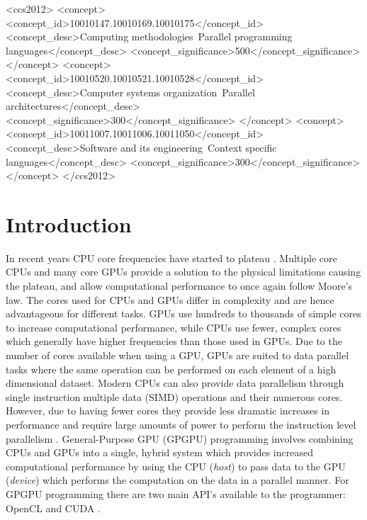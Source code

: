 \documentclass{sig-alternate-05-2015}
\begin{document}
%
%

\begin{CCSXML}
	<ccs2012>
	<concept>
	<concept_id>10010147.10010169.10010175</concept_id>
	<concept_desc>Computing methodologies~Parallel programming
	languages</concept_desc>
	<concept_significance>500</concept_significance>
	</concept>
	<concept>
	<concept_id>10010520.10010521.10010528</concept_id>
	<concept_desc>Computer systems organization~Parallel
	architectures</concept_desc>
	<concept_significance>300</concept_significance>
	</concept>
	<concept>
	<concept_id>10011007.10011006.10011050</concept_id>
	<concept_desc>Software and its engineering~Context specific
	languages</concept_desc>
	<concept_significance>300</concept_significance>
	</concept>
	</ccs2012>
\end{CCSXML}

%
%

%
%
\printccsdesc



\section{Introduction}\label{sec:intro}

In recent years CPU core frequencies have started to plateau 
\cite{standb}. Multiple core CPUs and many core GPUs provide a solution to the physical
limitations causing the plateau, and allow computational performance to once
again follow Moore's law. The cores used for CPUs and GPUs differ 
in complexity and are hence advantageous for different tasks. GPUs use hundreds
to thousands of simple cores to increase computational performance, while CPUs 
use fewer, complex cores which generally have higher frequencies than those used
in GPUs. Due to the number of cores available when using a GPU, GPUs are suited 
to data parallel tasks where the same operation can be performed on each element 
of a high dimensional dataset. Modern CPUs can also provide data parallelism through
single instruction multiple data (SIMD) operations and their numerous cores. However, 
due to having fewer cores they provide less dramatic increases in performance and require 
large amounts of power to perform the instruction level parallelism \cite{kumar:power}.
General-Purpose GPU (GPGPU) programming involves combining CPUs and GPUs 
into a single, hybrid system which provides increased computational performance 
by using the CPU (\textit{host}) to pass data to the GPU (\textit{device}) which 
performs the computation on the data in a parallel manner.
For GPGPU programming there are two main API's available to the programmer: 
OpenCL \cite{opencl} and CUDA \cite{cuda}. 
\end{document}
